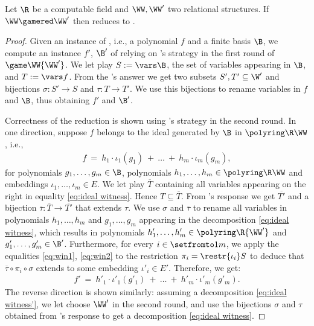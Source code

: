 \begin{theorem}\label{thm:red ord to well-ord}
Let $\R$ be a computable field and $\WW, \WW'$ two relational structures.
If $\WW \gamered \WW'$ then
 reduces to
.
\end{theorem}
%
\begin{proof}
Given an instance of , i.e., 
a polynomial $f$ and a finite basis $\B$,
we compute an instance $f'$, $\B'$ of   
relying on \Reducer's strategy in the first round of $\game \WW {\WW'}$.
We let \Spoiler play $S:=\vars \B$, the set of variables appearing in $\B$, and
$T:=\vars f$.
From the \Reducer's answer we get two subsets $S', T'\subseteq \W'$ and bijections
$\sigma : S'\to S$ and $\tau : T\to T'$.
We use this bijections to rename variables in $f$ and $\B$, thus obtaining $f'$ and $\B'$.

Correctness of the reduction is shown using \Reducer's strategy in the second round.
In one direction,
suppose $f$ belongs to the ideal generated by $\B$ in $\polyring \R \WW$, i.e.,
%
\begin{align} \label{eq:ideal witness}
f \ = \ h_1 \cdot \iota_1(g_1) \ + \ \ldots \ + \ h_m \cdot \iota_m(g_m),
\end{align}
%
for polynomials $g_1, \ldots, g_m \in \B$, polynomials $h_1, \ldots, h_m \in \polyring \R \WW$ and
embeddings $\iota_1, \ldots, \iota_m \in E$.
We let \Spoiler play $\overline T$ containing all variables appearing on the right in equality \eqref{eq:ideal witness}.
Hence $T \subseteq \overline T$.
From \Reducer's response we get  $\overline{T'}$ and a bijection
$\overline\tau : \overline T \to \overline{T'}$ that extends $\tau$. 
We use $\sigma$ and $\overline\tau$ to rename all variables 
in polynomials $h_1, \ldots, h_m$ and $g_1, \ldots, g_m$ appearing in the decomposition 
\eqref{eq:ideal witness}, which
results in polynomials $h'_1, \ldots, h'_m \in \polyring \R {\WW'}$ and
$g'_1, \ldots, g'_m \in \B'$.
Furthermore, for every $i \in\setfromto 1 m$, we apply
the equalities \eqref{eq:win1}, \eqref{eq:win2} %
to the restriction 
$\pi_i = \restr {\iota_i} S$ to deduce that
$\overline\tau \circ \pi_i \circ \sigma$ extends to some embedding
$\iota'_i \in E'$.
Therefore, we get:
%
\begin{align} \label{eq:ideal witness'}
f' \ = \ h'_1 \cdot \iota'_1(g'_1) \ + \ \ldots \ + \ h'_m \cdot \iota'_m(g'_m).
\end{align}
%
The reverse direction is shown similarly: assuming a decomposition \eqref{eq:ideal witness'},
we let \Spoiler choose $\WW'$ in the second round, and
use the bijections $\sigma$ and $\tau$ obtained from \Reducer's response 
to get a decomposition \eqref{eq:ideal witness}.
\end{proof}
